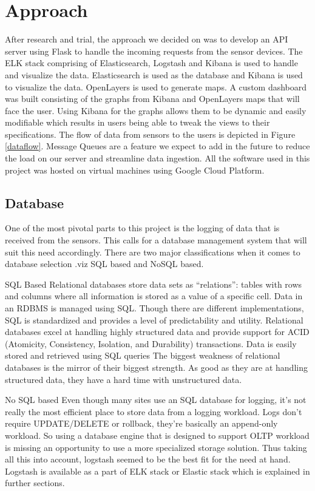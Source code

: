 \documentclass[]{report}
\begin{document}
\chapter{Approach}
After research and trial, the approach we decided on was to develop an API server using Flask to handle the incoming requests from the sensor devices. The ELK stack comprising of Elasticsearch, Logstash and Kibana is used to handle and visualize the data. Elasticsearch is used as the database and Kibana is used to visualize the data. OpenLayers is used to generate maps. A custom dashboard was built consisting of the graphs from Kibana and OpenLayers maps that will face the user. Using Kibana for the graphs allows them to be dynamic and easily modifiable which results in users being able to tweak the views to their specifications. The flow of data from sensors to the users is depicted in Figure \ref{dataflow}. Message Queues are a feature we expect to add in the future to reduce the load on our server and streamline data ingestion. All the software used in this project was hosted on virtual machines using Google Cloud Platform.

\section{Database}
One of the most pivotal parts to this project is the logging of data that is received from the sensors. This calls for a database management system that will suit this need accordingly. There are two major classifications when it comes to database selection .viz SQL based and NoSQL based.

SQL Based
Relational databases store data sets as “relations”: tables with rows and columns where all information is stored as a value of a specific cell. Data in an RDBMS is managed using SQL. Though there are different implementations, SQL is standardized and provides a level of predictability and utility.
Relational databases excel at handling highly structured data and provide support for ACID (Atomicity, Consistency, Isolation, and Durability) transactions. Data is easily stored and retrieved using SQL queries
The biggest weakness of relational databases is the mirror of their biggest strength. As good as they are at handling structured data, they have a hard time with unstructured data.

No SQL based
Even though many sites use an SQL database for logging, it’s not really the most efficient place to store data from a logging workload. Logs don’t require UPDATE/DELETE or rollback, they’re basically an append-only workload. So using a database engine that is designed to support OLTP workload is missing an opportunity to use a more specialized storage solution. Thus taking all this into account, logstash seemed to be the best fit for the need at hand. Logstash is available as a part of ELK stack or Elastic stack which is explained in further sections.
\end{document}
